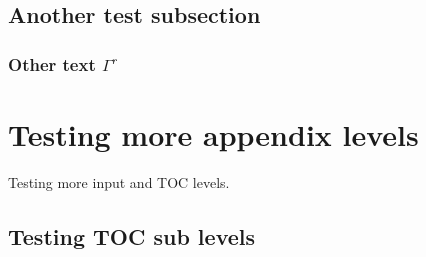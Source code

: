 \subsection{Another test subsection}

\subsubsection{Other text $\Gamma^{r}$}

\section{Testing more appendix levels}
Testing more input and TOC levels.

\subsection{Testing TOC sub levels}

